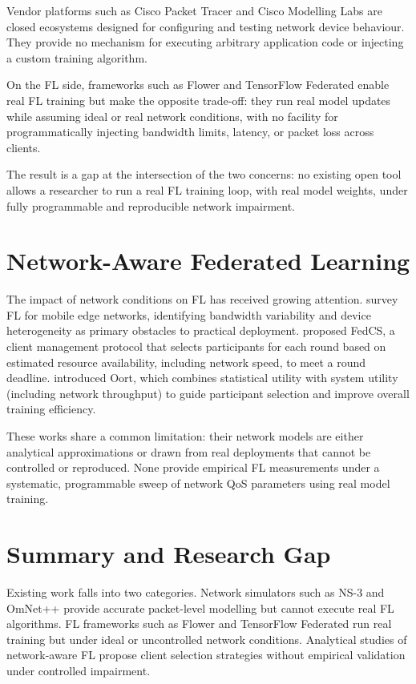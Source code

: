 \documentclass[12pt,a4paper]{report}
\begin{document}
Vendor platforms such as Cisco Packet Tracer and Cisco Modelling Labs are closed
ecosystems designed for configuring and testing network device behaviour. They provide
no mechanism for executing arbitrary application code or injecting a custom training
algorithm.

On the FL side, frameworks such as Flower \citep{beutel2020flower} and TensorFlow
Federated \citep{tff} enable real FL training but make the opposite trade-off: they
run real model updates while assuming ideal or real network conditions, with no
facility for programmatically injecting bandwidth limits, latency, or packet loss
across clients.

The result is a gap at the intersection of the two concerns: no existing open tool
allows a researcher to run a real FL training loop, with real model weights, under
fully programmable and reproducible network impairment.

\section{Network-Aware Federated Learning}

The impact of network conditions on FL has received growing attention.
\citet{lim2020federated} survey FL for mobile edge networks, identifying bandwidth
variability and device heterogeneity as primary obstacles to practical deployment.
\citet{nishio2019client} proposed FedCS, a client management
protocol that selects participants for each round based on estimated resource
availability, including network speed, to meet a round deadline.
\citet{lai2021oort} introduced Oort, which combines statistical utility with system
utility (including network throughput) to guide participant selection and improve
overall training efficiency.

These works share a common limitation: their network models are either analytical
approximations or drawn from real deployments that cannot be controlled or reproduced.
None provide empirical FL measurements under a systematic, programmable sweep of
network QoS parameters using real model training.

\section{Summary and Research Gap}

Existing work falls into two categories. Network simulators such as NS-3 and OmNet++
provide accurate packet-level modelling but cannot execute real FL algorithms.
FL frameworks such as Flower and TensorFlow Federated run real training but under
ideal or uncontrolled network conditions. Analytical studies of network-aware FL
propose client selection strategies without empirical validation under controlled
impairment.
\end{document}
